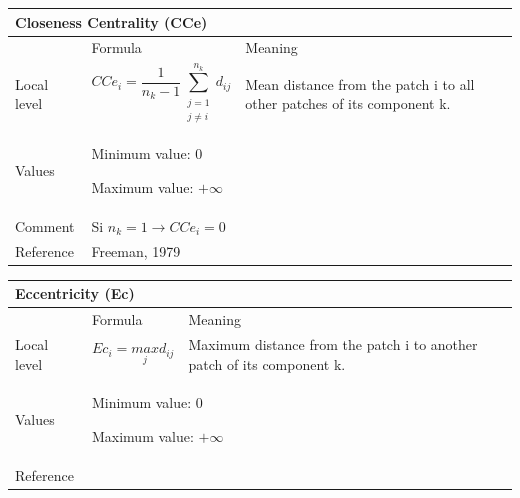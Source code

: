 \documentclass{article}
\begin{document}
\begin{table}[H]
\begin{tabular}{|m{3.24cm}|m{4.4810004cm}m{7.924cm}|}
\hline
\multicolumn{3}{|m{16.044998cm}|}{Closeness Centrality (CCe)}\\\hline
 &
\multicolumn{1}{m{4.4810004cm}|}{Formula} &
Meaning\\\hline
Local level

 &
\multicolumn{1}{m{4.4810004cm}|}{\begin{equation*}
{\mathit{CCe}}_{i}=\frac{1}{{n}_{k}-1}\sum
_{\begin{matrix}j=1\\j{\neq}i\end{matrix}}^{{n}_{k}}{{d}_{\mathit{ij}}}
\end{equation*}
} &
Mean distance from the patch i to all other patches of its component k.
\\\hline
Values &
\multicolumn{2}{m{12.6050005cm}|}{Minimum value: 0

Maximum value:  $+{\infty}$

}\\\hline
Comment &
\multicolumn{2}{m{12.6050005cm}|}{Si  ${n}_{k}=1\rightarrow
{\mathit{CCe}}_{i}=0$ }\\\hline
Reference &
\multicolumn{2}{m{12.6050005cm}|}{Freeman, 1979}\\\hline
\end{tabular}
\end{table}


\begin{table}[H]
\begin{tabular}{|m{3.24cm}|m{4.4810004cm}m{7.924cm}|}
\hline
\multicolumn{3}{|m{16.044998cm}|}{Eccentricity (Ec)}\\\hline
 &
\multicolumn{1}{m{4.4810004cm}|}{Formula} &
Meaning\\\hline
Local level

 &
\multicolumn{1}{m{4.4810004cm}|}{\begin{equation*}
{\mathit{Ec}}_{i}=\underset{j}{\mathit{max}}{d}_{\mathit{ij}}
\end{equation*}
} &
Maximum distance from the patch i to another patch of its component k.
\\\hline
Values &
\multicolumn{2}{m{12.6050005cm}|}{Minimum value: 0

Maximum value:  $+{\infty}$

}\\\hline
Reference &
\multicolumn{2}{m{12.6050005cm}|}{\cite{Urban2001}
}\\\hline
\end{tabular}
\end{table}
\end{document}
